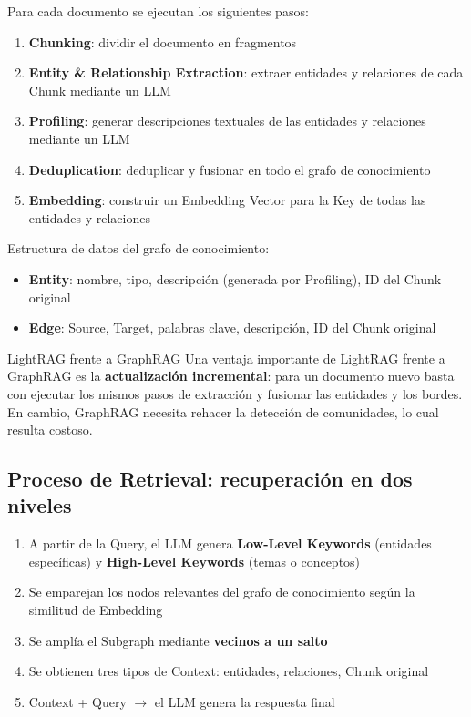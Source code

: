 \documentclass[a4paper]{article}
\begin{document}
Para cada documento se ejecutan los siguientes pasos:

\begin{enumerate}
    \item \textbf{Chunking}: dividir el documento en fragmentos
    \item \textbf{Entity \& Relationship Extraction}: extraer entidades y relaciones de cada Chunk mediante un LLM
    \item \textbf{Profiling}: generar descripciones textuales de las entidades y relaciones mediante un LLM
    \item \textbf{Deduplication}: deduplicar y fusionar en todo el grafo de conocimiento
    \item \textbf{Embedding}: construir un Embedding Vector para la Key de todas las entidades y relaciones
\end{enumerate}

Estructura de datos del grafo de conocimiento:
\begin{itemize}
    \item \textbf{Entity}: nombre, tipo, descripción (generada por Profiling), ID del Chunk original
    \item \textbf{Edge}: Source, Target, palabras clave, descripción, ID del Chunk original
\end{itemize}

\begin{knowledgebox}{LightRAG frente a GraphRAG}
Una ventaja importante de LightRAG frente a GraphRAG es la \textbf{actualización incremental}: para un documento nuevo basta con ejecutar los mismos pasos de extracción y fusionar las entidades y los bordes. En cambio, GraphRAG necesita rehacer la detección de comunidades, lo cual resulta costoso.
\end{knowledgebox}

\subsection{Proceso de Retrieval: recuperación en dos niveles}

\begin{enumerate}
    \item A partir de la Query, el LLM genera \textbf{Low-Level Keywords} (entidades específicas) y \textbf{High-Level Keywords} (temas o conceptos)
    \item Se emparejan los nodos relevantes del grafo de conocimiento según la similitud de Embedding
    \item Se amplía el Subgraph mediante \textbf{vecinos a un salto}
    \item Se obtienen tres tipos de Context: entidades, relaciones, Chunk original
    \item Context + Query $\rightarrow$ el LLM genera la respuesta final
\end{enumerate}
\end{document}
